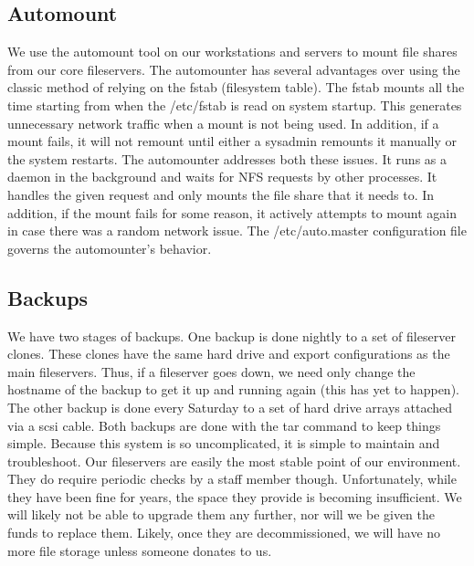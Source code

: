 \subsection{Automount}
We use the automount tool on our workstations and servers to mount file shares from our core fileservers.  The automounter has several advantages over using the classic method of relying on the fstab (filesystem table).  The fstab mounts all the time starting from when the /etc/fstab is read on system startup.  This generates unnecessary network traffic when a mount is not being used.  In addition, if a mount fails, it will not remount until either a sysadmin remounts it manually or the system restarts.  The automounter addresses both these issues.  It runs as a daemon in the background and waits for NFS requests by other processes.  It handles the given request and only mounts the file share that it needs to.  In addition, if the mount fails for some reason, it actively attempts to mount again in case there was a random network issue.  The /etc/auto.master configuration file governs the automounter's behavior.

\subsection{Backups}
We have two stages of backups.  One backup is done nightly to a set of fileserver clones.  These clones have the same hard drive and export configurations as the main fileservers.  Thus, if a fileserver goes down, we need only change the hostname of the backup to get it up and running again (this has yet to happen).  The other backup is done every Saturday to a set of hard drive arrays attached via a scsi cable.  Both backups are done with the tar command to keep things simple.  Because this system is so uncomplicated, it is simple to maintain and troubleshoot.  Our fileservers are easily the most stable point of our environment.  They do require periodic checks by a staff member though.  Unfortunately, while they have been fine for years, the space they provide is becoming insufficient.  We will likely not be able to upgrade them any further, nor will we be given the funds to replace them.  Likely, once they are decommissioned, we will have no more file storage unless someone donates to us.  

